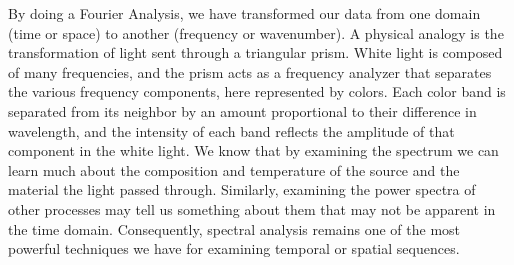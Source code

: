 	By doing a Fourier Analysis, we have transformed our data from one domain (time or space) 
to another (frequency or wavenumber).  A physical analogy is the transformation of light sent 
through a triangular prism.  White light is composed of many frequencies, and the prism acts as a 
frequency analyzer that separates the various frequency components, here represented by colors.  Each color band 
is separated from its neighbor by an amount proportional to their difference in wavelength, and 
the intensity of each band reflects the amplitude of that component in the white light.  We know 
that by examining the spectrum we can learn much about the composition and temperature of the 
source and the material the light passed through.  Similarly, examining the power spectra of 
other processes may tell us something about them that may not be apparent in the time domain.
Consequently, spectral analysis remains one of the most powerful techniques we have for examining
temporal or spatial sequences.

